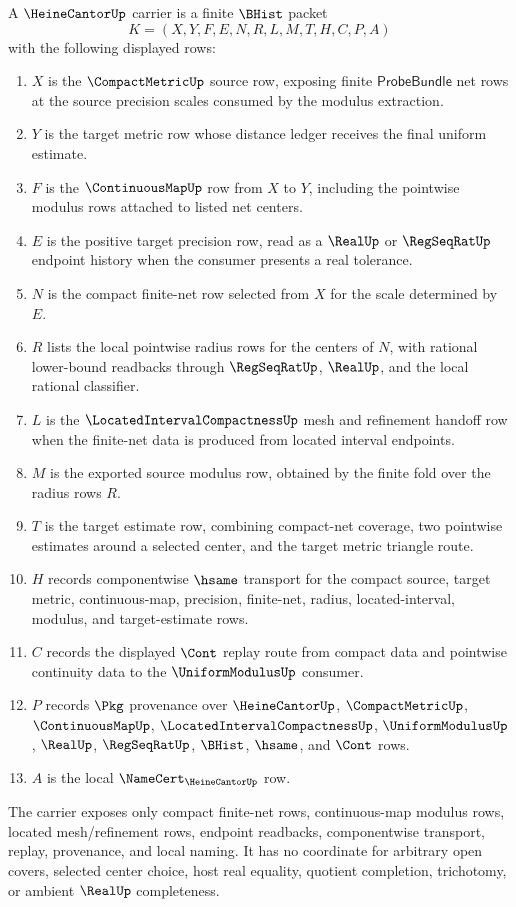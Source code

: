 \begin{definition}
\label{def:heine-cantor-carrier}
A $\HeineCantorUp$ carrier is a finite $\BHist$ packet
$$
K=(X,Y,F,E,N,R,L,M,T,H,C,P,A)
$$
with the following displayed rows:
\begin{enumerate}
\item $X$ is the $\CompactMetricUp$ source row, exposing finite $\mathsf{ProbeBundle}$ net rows at the source precision scales consumed by the modulus extraction.
\item $Y$ is the target metric row whose distance ledger receives the final uniform estimate.
\item $F$ is the $\ContinuousMapUp$ row from $X$ to $Y$, including the pointwise modulus rows attached to listed net centers.
\item $E$ is the positive target precision row, read as a $\RealUp$ or $\RegSeqRatUp$ endpoint history when the consumer presents a real tolerance.
\item $N$ is the compact finite-net row selected from $X$ for the scale determined by $E$.
\item $R$ lists the local pointwise radius rows for the centers of $N$, with rational lower-bound readbacks through $\RegSeqRatUp$, $\RealUp$, and the local rational classifier.
\item $L$ is the $\LocatedIntervalCompactnessUp$ mesh and refinement handoff row when the finite-net data is produced from located interval endpoints.
\item $M$ is the exported source modulus row, obtained by the finite fold over the radius rows $R$.
\item $T$ is the target estimate row, combining compact-net coverage, two pointwise estimates around a selected center, and the target metric triangle route.
\item $H$ records componentwise $\hsame$ transport for the compact source, target metric, continuous-map, precision, finite-net, radius, located-interval, modulus, and target-estimate rows.
\item $C$ records the displayed $\Cont$ replay route from compact data and pointwise continuity data to the $\UniformModulusUp$ consumer.
\item $P$ records $\Pkg$ provenance over $\HeineCantorUp$, $\CompactMetricUp$, $\ContinuousMapUp$, $\LocatedIntervalCompactnessUp$, $\UniformModulusUp$, $\RealUp$, $\RegSeqRatUp$, $\BHist$, $\hsame$, and $\Cont$ rows.
\item $A$ is the local $\NameCert_{\HeineCantorUp}$ row.
\end{enumerate}
The carrier exposes only compact finite-net rows, continuous-map modulus rows, located mesh/refinement rows, endpoint readbacks, componentwise transport, replay, provenance, and local naming. It has no coordinate for arbitrary open covers, selected center choice, host real equality, quotient completion, trichotomy, or ambient $\RealUp$ completeness.
\end{definition}

